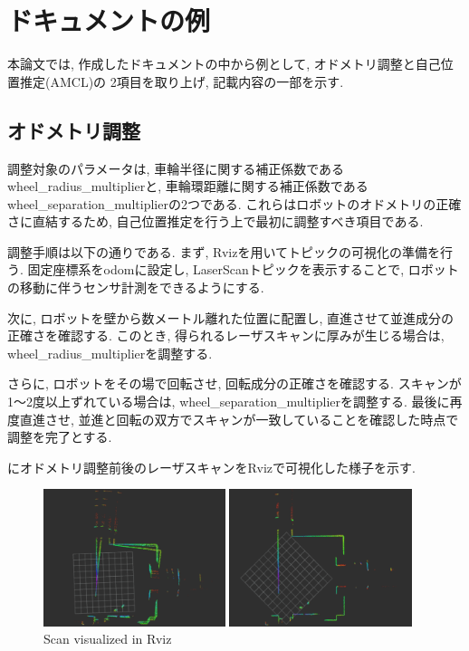 \section{ドキュメントの例}
本論文では, 作成したドキュメントの中から例として, オドメトリ調整と自己位置推定(AMCL)の
2項目を取り上げ, 記載内容の一部を示す. 

\subsection{オドメトリ調整}
調整対象のパラメータは, 車輪半径に関する補正係数であるwheel\_radius\_multiplierと, 車輪環距離に関する補正係数であるwheel\_separation\_multiplierの2つである. 
これらはロボットのオドメトリの正確さに直結するため, 自己位置推定を行う上で最初に調整すべき項目である. 

調整手順は以下の通りである. まず, Rvizを用いてトピックの可視化の準備を行う. 固定座標系をodomに設定し, LaserScanトピックを表示することで, ロボットの移動に伴うセンサ計測をできるようにする. 

次に, ロボットを壁から数メートル離れた位置に配置し, 直進させて並進成分の正確さを確認する. 
このとき, 得られるレーザスキャンに厚みが生じる場合は, wheel\_radius\_multiplierを調整する. 

さらに, ロボットをその場で回転させ, 回転成分の正確さを確認する. 
スキャンが1〜2度以上ずれている場合は, wheel\_separation\_multiplierを調整する. 
最後に再度直進させ, 並進と回転の双方でスキャンが一致していることを確認した時点で調整を完了とする. 

にオドメトリ調整前後のレーザスキャンをRvizで可視化した様子を示す. 
\begin{figure}[h]
     \centering
     \begin{minipage}[c]{65mm}
         \centering
         \includegraphics[height=40mm]{images/before_odom.png}
     \end{minipage}
     \begin{minipage}[c]{65mm}
         \centering
         \includegraphics[height=40mm]{images/after_odom.png}
     \end{minipage}
     \caption{Scan visualized in Rviz}
     \label{fig:Scanvisualizedinrviz}
\end{figure}

